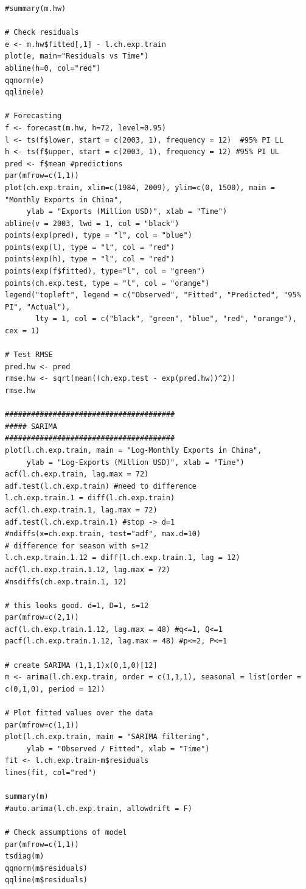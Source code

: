 \documentclass[]{article}
\begin{document}
\begin{Verbatim}[frame=single]
#summary(m.hw)

# Check residuals
e <- m.hw$fitted[,1] - l.ch.exp.train
plot(e, main="Residuals vs Time")
abline(h=0, col="red")
qqnorm(e)
qqline(e)

# Forecasting
f <- forecast(m.hw, h=72, level=0.95)
l <- ts(f$lower, start = c(2003, 1), frequency = 12)  #95% PI LL
h <- ts(f$upper, start = c(2003, 1), frequency = 12) #95% PI UL
pred <- f$mean #predictions
par(mfrow=c(1,1))
plot(ch.exp.train, xlim=c(1984, 2009), ylim=c(0, 1500), main = "Monthly Exports in China",
     ylab = "Exports (Million USD)", xlab = "Time")
abline(v = 2003, lwd = 1, col = "black")
points(exp(pred), type = "l", col = "blue")
points(exp(l), type = "l", col = "red")
points(exp(h), type = "l", col = "red")
points(exp(f$fitted), type="l", col = "green")
points(ch.exp.test, type = "l", col = "orange")
legend("topleft", legend = c("Observed", "Fitted", "Predicted", "95% PI", "Actual"),
       lty = 1, col = c("black", "green", "blue", "red", "orange"), cex = 1)

# Test RMSE
pred.hw <- pred
rmse.hw <- sqrt(mean((ch.exp.test - exp(pred.hw))^2))
rmse.hw

#######################################
##### SARIMA
#######################################
plot(l.ch.exp.train, main = "Log-Monthly Exports in China", 
     ylab = "Log-Exports (Million USD)", xlab = "Time")
acf(l.ch.exp.train, lag.max = 72)
adf.test(l.ch.exp.train) #need to difference
l.ch.exp.train.1 = diff(l.ch.exp.train)
acf(l.ch.exp.train.1, lag.max = 72)
adf.test(l.ch.exp.train.1) #stop -> d=1
#ndiffs(x=ch.exp.train, test="adf", max.d=10)
# difference for season with s=12
l.ch.exp.train.1.12 = diff(l.ch.exp.train.1, lag = 12)
acf(l.ch.exp.train.1.12, lag.max = 72)
#nsdiffs(ch.exp.train.1, 12)

# this looks good. d=1, D=1, s=12
par(mfrow=c(2,1))
acf(l.ch.exp.train.1.12, lag.max = 48) #q<=1, Q<=1
pacf(l.ch.exp.train.1.12, lag.max = 48) #p<=2, P<=1

# create SARIMA (1,1,1)x(0,1,0)[12]
m <- arima(l.ch.exp.train, order = c(1,1,1), seasonal = list(order = c(0,1,0), period = 12))

# Plot fitted values over the data
par(mfrow=c(1,1))
plot(l.ch.exp.train, main = "SARIMA filtering", 
     ylab = "Observed / Fitted", xlab = "Time")
fit <- l.ch.exp.train-m$residuals
lines(fit, col="red")

summary(m)
#auto.arima(l.ch.exp.train, allowdrift = F)

# Check assumptions of model
par(mfrow=c(1,1))
tsdiag(m)
qqnorm(m$residuals)
qqline(m$residuals)


\end{Verbatim}
\end{document}
